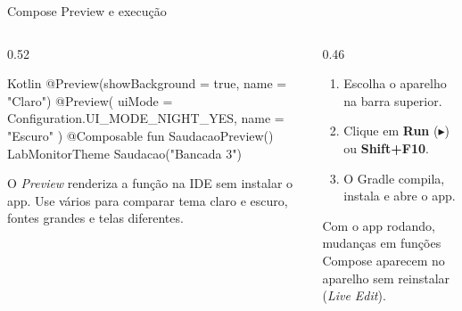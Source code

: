 \documentclass[aspectratio=169,10pt]{beamer}
\begin{document}
\begin{frame}[fragile]{Compose Preview e execução}
  \begin{columns}[T]
    \begin{column}{0.52\textwidth}
\begin{codigo}[title=Preview]{Kotlin}
@Preview(showBackground = true, name = "Claro")
@Preview(
  uiMode = Configuration.UI_MODE_NIGHT_YES,
  name = "Escuro"
)
@Composable
fun SaudacaoPreview() {
  LabMonitorTheme {
    Saudacao("Bancada 3")
  }
}
\end{codigo}
      \begin{dica}
        O \emph{Preview} renderiza a função na IDE sem instalar o app. Use vários  para comparar tema claro e escuro, fontes grandes e telas diferentes.
      \end{dica}
    \end{column}
    \begin{column}{0.46\textwidth}
      \begin{conceito}[Executando]
        \begin{enumerate}
          \item Escolha o aparelho na barra superior.
          \item Clique em \textbf{Run} (\textcolor{verdeok}{$\blacktriangleright$}) ou \textbf{Shift+F10}.
          \item O Gradle compila, instala e abre o app.
        \end{enumerate}
      \end{conceito}
      \begin{conceito}
        Com o app rodando, mudanças em funções Compose aparecem no aparelho sem reinstalar (\emph{Live Edit}).
      \end{conceito}
    \end{column}
  \end{columns}
\end{frame}
\end{document}
